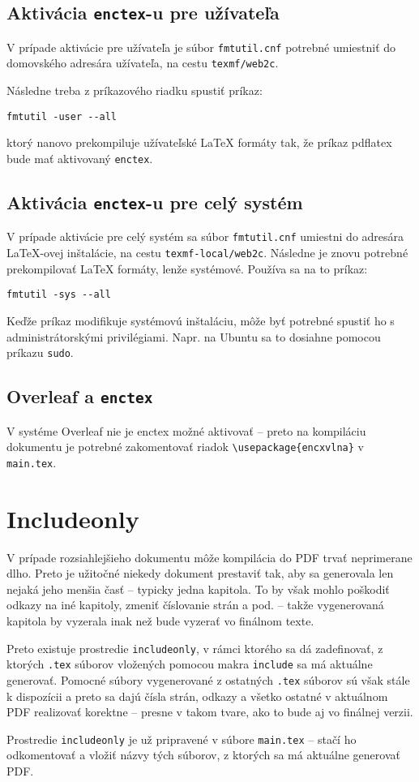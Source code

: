 \subsection{Aktivácia \texttt{enctex}-u pre užívateľa}

V prípade aktivácie pre užívateľa je súbor \texttt{fmtutil.cnf} potrebné umiestniť do domovského adresára užívateľa, na cestu \texttt{texmf/web2c}.

Následne treba z príkazového riadku spustiť príkaz:
\begin{Verbatim}
fmtutil -user --all
\end{Verbatim}
ktorý nanovo prekompiluje užívateľské LaTeX formáty tak, že príkaz pdflatex bude mať aktivovaný \texttt{enctex}.

\subsection{Aktivácia \texttt{enctex}-u pre celý systém}

V prípade aktivácie pre celý systém sa súbor \texttt{fmtutil.cnf} umiestni do adresára LaTeX-ovej inštalácie, na cestu \texttt{texmf-local/web2c}. Následne je znovu potrebné prekompilovať LaTeX formáty, lenže systémové. Používa sa na to príkaz:
\begin{Verbatim}
fmtutil -sys --all
\end{Verbatim}
Keďže príkaz modifikuje systémovú inštaláciu, môže byť potrebné spustiť ho s administrátorskými privilégiami. Napr. na Ubuntu sa to dosiahne pomocou príkazu \texttt{sudo}.

\subsection{Overleaf a \texttt{enctex}}

V systéme Overleaf nie je enctex možné aktivovať -- preto na kompiláciu dokumentu je potrebné zakomentovať riadok \texttt{\textbackslash{usepackage}\{encxvlna\}} v \texttt{main.tex}.

\section{Includeonly}

V prípade rozsiahlejšieho dokumentu môže kompilácia do PDF trvať neprimerane dlho. Preto je užitočné niekedy dokument prestaviť tak, aby sa generovala len nejaká jeho menšia časť -- typicky jedna kapitola. To by však mohlo poškodiť odkazy na iné kapitoly, zmeniť číslovanie strán a pod. -- takže vygenerovaná kapitola by vyzerala inak než bude vyzerať vo finálnom texte.

Preto existuje prostredie \texttt{includeonly}, v rámci ktorého sa dá zadefinovať, z ktorých \texttt{.tex} súborov vložených pomocou makra \texttt{include} sa má aktuálne generovať. Pomocné súbory vygenerované z ostatných \texttt{.tex} súborov sú však stále k dispozícii a preto sa dajú čísla strán, odkazy a všetko ostatné v aktuálnom PDF realizovať korektne -- presne v takom tvare, ako to bude aj vo finálnej verzii.

Prostredie \texttt{includeonly} je už pripravené v súbore \texttt{main.tex} -- stačí ho odkomentovať a vložiť názvy tých súborov, z ktorých sa má aktuálne generovať PDF.
